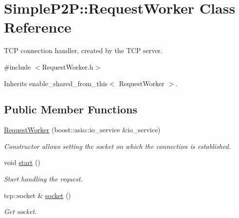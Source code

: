 \hypertarget{classSimpleP2P_1_1RequestWorker}{}\section{Simple\+P2P\+:\+:Request\+Worker Class Reference}
\label{classSimpleP2P_1_1RequestWorker}


T\+CP connection handler, created by the T\+CP server.  




{\ttfamily \#include $<$Request\+Worker.\+h$>$}



Inherits enable\+\_\+shared\+\_\+from\+\_\+this$<$ Request\+Worker $>$.

\subsection*{Public Member Functions}
\begin{DoxyCompactItemize}
\item 
\mbox{\label{classSimpleP2P_1_1RequestWorker_abccdef4b69527693cc3d8681cead05b1}} 
\hyperlink{classSimpleP2P_1_1RequestWorker_abccdef4b69527693cc3d8681cead05b1}{Request\+Worker} (boost\+::asio\+::io\+\_\+service \&io\+\_\+service)
\begin{DoxyCompactList}\small\item\em Constructor allows setting the socket on which the connection is established. \end{DoxyCompactList}\item 
\mbox{\label{classSimpleP2P_1_1RequestWorker_a08b2e9500f0e6d84c0d79f82207dd16d}} 
void \hyperlink{classSimpleP2P_1_1RequestWorker_a08b2e9500f0e6d84c0d79f82207dd16d}{start} ()
\begin{DoxyCompactList}\small\item\em Start handling the request. \end{DoxyCompactList}\item 
\mbox{\label{classSimpleP2P_1_1RequestWorker_abcac032e7b8a594f375bb36f92beed64}} 
tcp\+::socket \& \hyperlink{classSimpleP2P_1_1RequestWorker_abcac032e7b8a594f375bb36f92beed64}{socket} ()
\begin{DoxyCompactList}\small\item\em Get socket. \end{DoxyCompactList}\end{DoxyCompactItemize}


